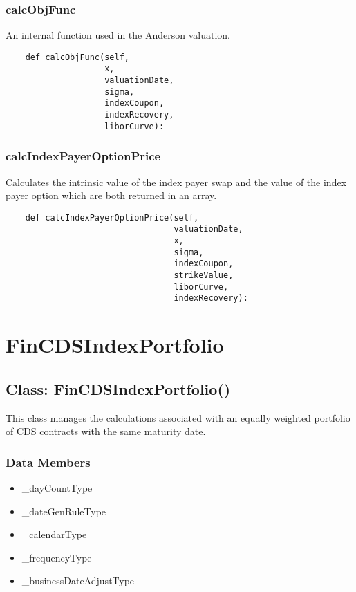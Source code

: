 \documentclass[twoside,11pt]{book}
\begin{document}
\subsubsection*{{\bf calcObjFunc}}
An internal function used in the Anderson valuation.  

\begin{lstlisting}
    def calcObjFunc(self,
                    x,
                    valuationDate,
                    sigma,
                    indexCoupon,
                    indexRecovery,
                    liborCurve):
\end{lstlisting}

\subsubsection*{{\bf calcIndexPayerOptionPrice}}
Calculates the intrinsic value of the index payer swap and the value of the index payer option which are both returned in an array.  

\begin{lstlisting}
    def calcIndexPayerOptionPrice(self,
                                  valuationDate,
                                  x,
                                  sigma,
                                  indexCoupon,
                                  strikeValue,
                                  liborCurve,
                                  indexRecovery):
\end{lstlisting}

\newpage
\section{FinCDSIndexPortfolio}

\subsection*{Class: FinCDSIndexPortfolio()}
This class manages the calculations associated with an equally weighted portfolio of CDS contracts with the same maturity date.  

\subsubsection*{Data Members}
\begin{itemize}
\item{\_dayCountType}
\item{\_dateGenRuleType}
\item{\_calendarType}
\item{\_frequencyType}
\item{\_businessDateAdjustType}
\end{itemize}
\end{document}

